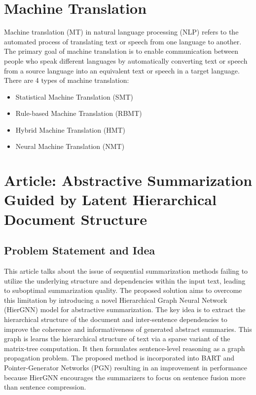 \documentclass{article}
\begin{document}
\section{Machine Translation}
Machine translation (MT) in natural language processing (NLP) refers to the automated process of translating text or speech from one language to another. The primary goal of machine translation is to enable communication between people who speak different languages by automatically converting text or speech from a source language into an equivalent text or speech in a target language. There are 4 types of machine translation:
\begin{itemize}
  \item Statistical Machine Translation (SMT)
  \item Rule-based Machine Translation (RBMT)
  \item Hybrid Machine Translation (HMT)
  \item Neural Machine Translation (NMT)
\end{itemize}
\pagebreak

\section{Article: Abstractive Summarization Guided by Latent Hierarchical Document Structure}

\subsection{Problem Statement and Idea}
This article talks about the issue of sequential summarization methods failing to utilize the underlying structure and dependencies within the input text, leading to suboptimal summarization quality. The proposed solution aims to overcome this limitation by introducing a novel Hierarchical Graph Neural Network (HierGNN) model for abstractive summarization. The key idea is to extract the hierarchical structure of the document and inter-sentence dependencies to improve the coherence and informativeness of generated abstract summaries. This graph is learns the hierarchical structure of text via a sparse variant of the matrix-tree computation. It then formulates sentence-level
reasoning as a graph propagation problem. The proposed method is incorporated into BART and Pointer-Generator Networks (PGN) resulting in an improvement in performance because HierGNN encourages the summarizers to focus on sentence fusion more than sentence compression.
\end{document}

